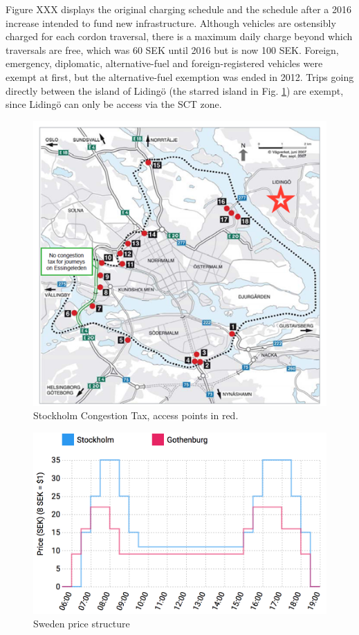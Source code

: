 Figure XXX displays the original charging schedule and the schedule after a 2016 increase intended to fund new infrastructure. Although vehicles are ostensibly charged for each cordon traversal, there is a maximum daily charge beyond which traversals are free, which was 60 SEK until 2016 but is now 100 SEK. Foreign, emergency, diplomatic, alternative-fuel and foreign-registered vehicles were exempt at first, but the alternative-fuel exemption was ended in 2012. Trips going directly between the island of Liding\"o (the starred island in Fig. \ref{fig:stockholm-map}) are exempt, since Liding\"o can only be access via the SCT zone.

\begin{figure}
    \includegraphics[width=5in]{../img/stockholm-map.png}
    \caption{Stockholm Congestion Tax, access points in red. \citep{transportstyrelsen2015}}
    \label{fig:stockholm-map}
\end{figure}

\begin{figure}
    \includegraphics[width=4.5in]{../img/sweden-prices.png}
    \caption{Sweden price structure \citep{transportstyrelsen2015}}
    \label{fig:sweden-schedules}
\end{figure}


